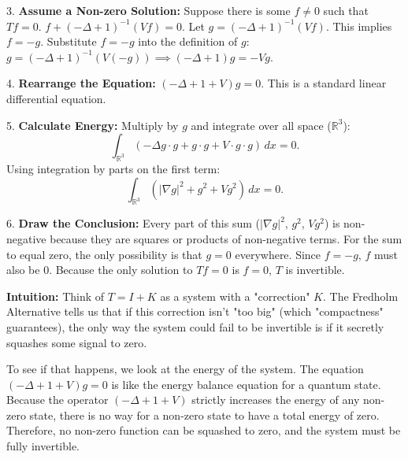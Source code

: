 \begin{solution}
\par\vspace{\baselineskip}
3. \textbf{Assume a Non-zero Solution:} Suppose there is some $f \neq 0$ such that $Tf = 0$.
$f + (-\Delta+1)^{-1}(Vf) = 0$.
Let $g = (-\Delta+1)^{-1}(Vf)$. This implies $f = -g$.
Substitute $f = -g$ into the definition of $g$:
$g = (-\Delta+1)^{-1}(V(-g)) \implies (-\Delta+1)g = -Vg$.

\par\vspace{\baselineskip}
4. \textbf{Rearrange the Equation:}
$(-\Delta + 1 + V)g = 0$.
This is a standard linear differential equation.

\par\vspace{\baselineskip}
5. \textbf{Calculate Energy:} Multiply by $g$ and integrate over all space ($\mathbb{R}^3$):
\[
\int_{\mathbb{R}^3} (-\Delta g \cdot g + g \cdot g + V \cdot g \cdot g) \, dx = 0.
\]
Using integration by parts on the first term:
\[
\int_{\mathbb{R}^3} (|\nabla g|^2 + g^2 + Vg^2) \, dx = 0.
\]

\par\vspace{\baselineskip}
6. \textbf{Draw the Conclusion:} Every part of this sum ($|\nabla g|^2$, $g^2$, $Vg^2$) is non-negative because they are squares or products of non-negative terms. For the sum to equal zero, the only possibility is that $g=0$ everywhere.
Since $f = -g$, $f$ must also be $0$.
Because the only solution to $Tf=0$ is $f=0$, $T$ is invertible.

\par\vspace{\baselineskip}
\textbf{Intuition:}
Think of $T = I + K$ as a system with a "correction" $K$. The Fredholm Alternative tells us that if this correction isn't "too big" (which "compactness" guarantees), the only way the system could fail to be invertible is if it secretly squashes some signal to zero.

\par\vspace{\baselineskip}
To see if that happens, we look at the energy of the system. The equation $(-\Delta + 1 + V)g = 0$ is like the energy balance equation for a quantum state. Because the operator $(-\Delta + 1 + V)$ strictly increases the energy of any non-zero state, there is no way for a non-zero state to have a total energy of zero. Therefore, no non-zero function can be squashed to zero, and the system must be fully invertible.
\end{solution}

